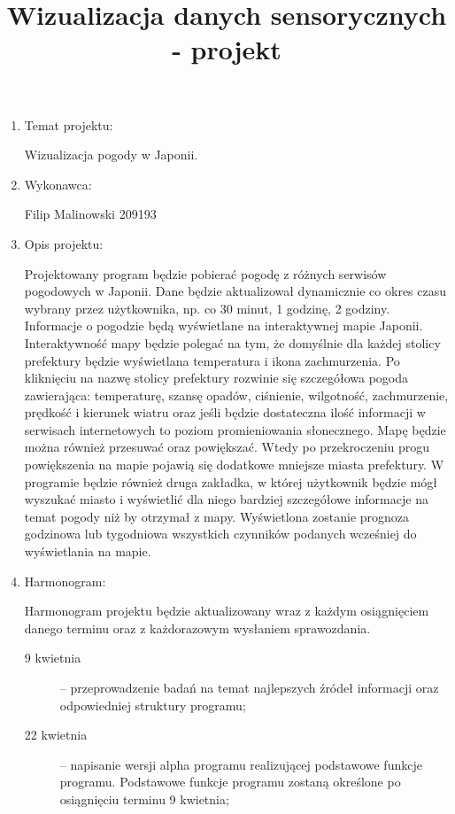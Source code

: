 \documentclass[a4paper]{article}
\title{Wizualizacja danych sensorycznych - projekt}
\date{}
\begin{document}
\maketitle

\begin{enumerate}

\item Temat projektu:

Wizualizacja pogody w Japonii.

\item Wykonawca:

Filip Malinowski 209193

\item Opis projektu:

Projektowany program będzie pobierać pogodę z różnych serwisów pogodowych w Japonii. Dane będzie aktualizował dynamicznie co okres czasu wybrany przez użytkownika, np. co 30 minut, 1 godzinę, 2 godziny. Informacje o pogodzie będą wyświetlane na interaktywnej mapie Japonii. Interaktywność mapy będzie polegać na tym, że domyślnie dla każdej stolicy prefektury będzie wyświetlana temperatura i ikona zachmurzenia. Po kliknięciu na nazwę stolicy prefektury rozwinie się szczegółowa pogoda zawierająca: temperaturę, szansę opadów, ciśnienie, wilgotność,  zachmurzenie, prędkość i kierunek wiatru oraz jeśli będzie dostateczna ilość informacji w serwisach internetowych to poziom promieniowania słonecznego. Mapę będzie można również przesuwać oraz powiększać. Wtedy po przekroczeniu progu powiększenia na mapie pojawią się dodatkowe mniejsze miasta prefektury. W programie będzie również druga zakładka, w której użytkownik będzie mógł wyszukać miasto  i wyświetlić dla niego bardziej szczegółowe informacje na temat pogody niż by otrzymał z mapy. Wyświetlona zostanie prognoza godzinowa lub tygodniowa wszystkich czynników podanych wcześniej do wyświetlania na mapie.

\item Harmonogram:

Harmonogram projektu będzie aktualizowany wraz z każdym osiągnięciem danego terminu oraz z każdorazowym wysłaniem sprawozdania.

\begin{description}
\item[9 kwietnia] – przeprowadzenie badań na temat najlepszych źródeł informacji oraz odpowiedniej struktury programu;

\item[22 kwietnia] – napisanie wersji alpha programu realizującej podstawowe funkcje programu. Podstawowe funkcje programu zostaną określone po osiągnięciu terminu 9 kwietnia;


\end{description}
\end{enumerate}
\end{document}
